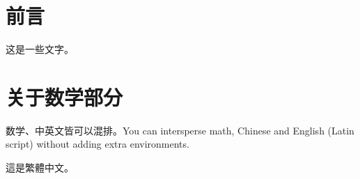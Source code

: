 \documentclass[zihao=-4,heading=true,a4paper,twoside,openany]{ctexart}
\begin{document}
\section*{前言}
这是一些文字。

\section*{关于数学部分}
数学、中英文皆可以混排。You can intersperse math, Chinese and English (Latin script) without adding extra environments.

這是繁體中文。
\end{document}
